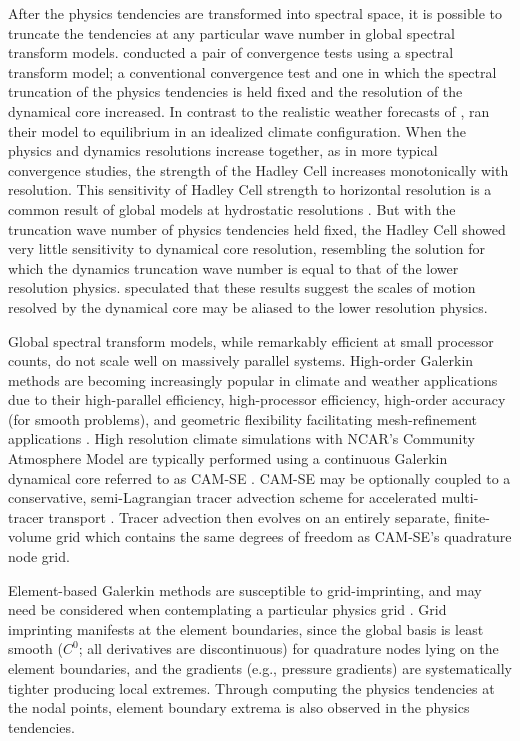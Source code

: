 \documentclass[draft,linenumbers]{agujournal}
\begin{document}
After the physics tendencies are transformed into spectral space, it is possible to truncate the tendencies at any particular wave number in global spectral transform models. \cite{W1999T} conducted a pair of convergence tests using a spectral transform model; a conventional convergence test and one in which the spectral truncation of the physics tendencies is held fixed and the resolution of the dynamical core increased. In contrast to the realistic weather forecasts of \cite{W2014PTRSL}, \cite{W1999T} ran their model to equilibrium in an idealized climate configuration. When the physics and dynamics resolutions increase together, as in more typical convergence studies, the strength of the Hadley Cell increases monotonically with resolution. This sensitivity of Hadley Cell strength to horizontal resolution is a common result of global models at hydrostatic resolutions \citep[see][and references therein]{HR2017JCLIM}. But with the truncation wave number of physics tendencies held fixed, the Hadley Cell showed very little sensitivity to dynamical core resolution, resembling the solution for which the dynamics truncation wave number is equal to that of the lower resolution physics. \cite{HR2017JCLIM} speculated that these results suggest the scales of motion resolved by the dynamical core may be aliased to the lower resolution physics.

Global spectral transform models, while remarkably efficient at small processor counts, do not scale well on massively parallel systems. High-order Galerkin methods are becoming increasingly popular in climate and weather applications due to their high-parallel efficiency, high-processor efficiency, high-order accuracy (for smooth problems), and geometric flexibility facilitating mesh-refinement applications \citep[e.g.,][and the Energy Exascale Earth System Model; \url{https://e3sm.org/}]{Giraldo20083849,NCT2009CF,BSBDK2013TCFD}. High resolution climate simulations with NCAR's Community Atmosphere Model \citep[CAM;][]{CAM5} are typically performed using a continuous Galerkin dynamical core referred to as CAM-SE \citep[CAM Spectral Elements;][]{TES2008JPCS,DetAl2012IJHPCA,LetAl2018JAMES}. CAM-SE may be optionally coupled to a conservative, semi-Lagrangian tracer advection scheme for accelerated multi-tracer transport \citep[CAM-SE-CSLAM;][]{LTOUNGK2017MWR}. Tracer advection then evolves on an entirely separate, finite-volume grid which contains the same degrees of freedom as CAM-SE's quadrature node grid.

Element-based Galerkin methods are susceptible to grid-imprinting, and may need be considered when contemplating a particular physics grid \citep[][hereafter referred to as H18]{HL2018MWR}. Grid imprinting manifests at the element boundaries, since the global basis is least smooth ($C^{0}$; all derivatives are discontinuous) for quadrature nodes lying on the element boundaries, and the gradients (e.g., pressure gradients) are systematically tighter producing local extremes. Through computing the physics tendencies at the nodal points, element boundary extrema is also observed in the physics tendencies. 
\end{document}
